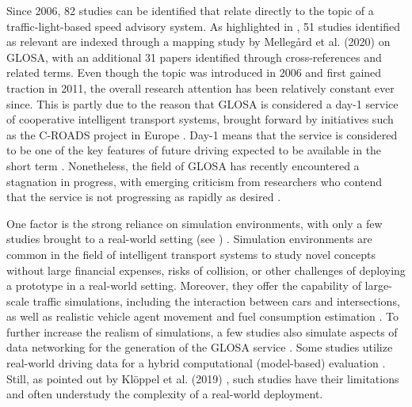 Since 2006, 82 studies can be identified that relate directly to the topic of a traffic-light-based speed advisory system. As highlighted in , 51 studies identified as relevant are indexed through a mapping study by Mellegård et al. (2020) \cite{mellegard_day_2020} on GLOSA, with an additional 31 papers identified through cross-references and related terms. Even though the topic was introduced in 2006 and first gained traction in 2011, the overall research attention has been relatively constant ever since. This is partly due to the reason that GLOSA is considered a day-1 service of cooperative intelligent transport systems, brought forward by initiatives such as the C-ROADS project in Europe \cite{sharara_impact_2019}. Day-1 means that the service is considered to be one of the key features of future driving expected to be available in the short term \cite{mellegard_day_2020}. Nonetheless, the field of GLOSA has recently encountered a stagnation in progress, with emerging criticism from researchers who contend that the service is not progressing as rapidly as desired \cite{mellegard_day_2020, otto_framework_2023}.

One factor is the strong reliance on simulation environments, with only a few studies brought to a real-world setting (see ) \cite{mellegard_day_2020}. Simulation environments are common in the field of intelligent transport systems to study novel concepts without large financial expenses, risks of collision, or other challenges of deploying a prototype in a real-world setting. Moreover, they offer the capability of  large-scale traffic simulations, including the interaction between cars and intersections, as well as realistic vehicle agent movement and fuel consumption estimation \cite{kloeppel_performance_2019, pariota_green_2019}. To further increase the realism of simulations, a few studies also simulate aspects of data networking for the generation of the GLOSA service \cite{sharara_impact_2019}. Some studies utilize real-world driving data for a hybrid computational (model-based) evaluation \cite{raubitschek_predictive_2011, luo_green_2017, xie_dynamic_2021, bhattacharyya_assessing_2022}. Still, as pointed out by Klöppel et al. (2019) \cite{kloeppel_performance_2019}, such studies have their limitations and often understudy the complexity of a real-world deployment.

